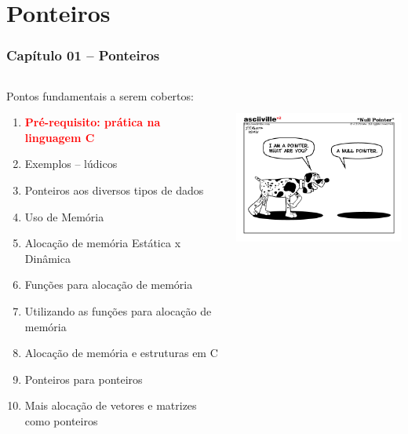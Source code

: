 
\section{Ponteiros}

\begin{frame}[allowframebreaks=0.7]

\frametitle{\Large Capítulo 01 -- Ponteiros}
\begin{columns}
\begin{column}{.4\textwidth}
\centering
Pontos fundamentais a serem cobertos:
  
  \begin{small}
  \begin{enumerate}
  \item \textbf{\textcolor{red}{Pré-requisito: prática na linguagem C}}
  \item Exemplos -- lúdicos
  \item Ponteiros aos diversos tipos de dados
  \item Uso de Memória
  \item Alocação de memória Estática x Dinâmica
  \item  Funções para alocação de memória
  \item  Utilizando as funções para alocação de memória
  \item  Alocação de memória e estruturas em C
  \item  Ponteiros para ponteiros
  \item Mais alocação de vetores e matrizes como ponteiros
\end{enumerate}  
  \end{small}
  
\end{column}

\begin{column}{.6\textwidth}
\vskip -1.5cm

\includegraphics[height=6cm, width=7cm]{figs/fig_ponteiros/nulo-pointer.png}
\end{column}

\end{columns}

\end{frame}



